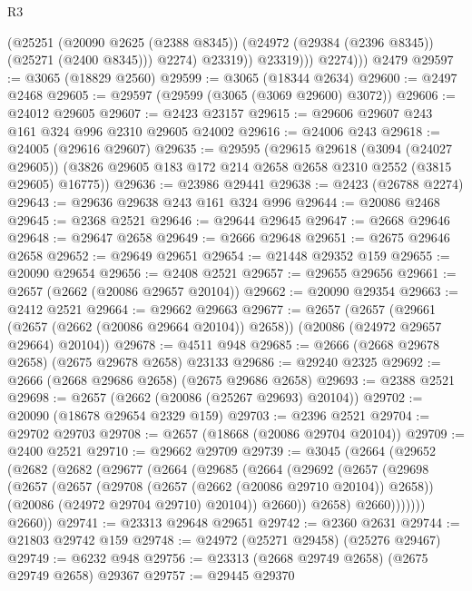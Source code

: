 \begin{lexlean}{R3}
\begin{coremodule}
                  (@25251
                    (@20090 @2625 (@2388 @8345))
                    (@24972 (@29384 (@2396 @8345)) (@25271 (@2400 @8345)))
                    @2274)
                  @23319))
              @23319)))
          @2274)))
    @2479
@29597 := @3065 (@18829 @2560)
@29599 := @3065 (@18344 @2634)
@29600 := @2497 @2468
@29605 := @29597 (@29599 (@3065 (@3069 @29600) @3072))
@29606 := @24012 @29605
@29607 := @2423 @23157
@29615 := @29606 @29607 @243 @161 @324 @996 @2310 @29605 @24002
@29616 := @24006 @243
@29618 := @24005 (@29616 @29607)
@29635 := @29595
    (@29615
      @29618
      (@3094 (@24027 @29605))
      (@3826 @29605 @183 @172 @214 @2658 @2658 @2310 @2552 (@3815 @29605) @16775))
@29636 := @23986 @29441
@29638 := @2423 (@26788 @2274)
@29643 := @29636 @29638 @243 @161 @324 @996
@29644 := @20086 @2468
@29645 := @2368 @2521
@29646 := @29644 @29645
@29647 := @2668 @29646
@29648 := @29647 @2658
@29649 := @2666 @29648
@29651 := @2675 @29646 @2658
@29652 := @29649 @29651
@29654 := @21448 @29352 @159
@29655 := @20090 @29654
@29656 := @2408 @2521
@29657 := @29655 @29656
@29661 := @2657 (@2662 (@20086 @29657 @20104))
@29662 := @20090 @29354
@29663 := @2412 @2521
@29664 := @29662 @29663
@29677 := @2657
    (@2657
      (@29661 (@2657 (@2662 (@20086 @29664 @20104)) @2658))
      (@20086 (@24972 @29657 @29664) @20104))
@29678 := @4511 @948
@29685 := @2666 (@2668 @29678 @2658) (@2675 @29678 @2658) @23133
@29686 := @29240 @2325
@29692 := @2666 (@2668 @29686 @2658) (@2675 @29686 @2658)
@29693 := @2388 @2521
@29698 := @2657 (@2662 (@20086 (@25267 @29693) @20104))
@29702 := @20090 (@18678 @29654 @2329 @159)
@29703 := @2396 @2521
@29704 := @29702 @29703
@29708 := @2657 (@18668 (@20086 @29704 @20104))
@29709 := @2400 @2521
@29710 := @29662 @29709
@29739 := @3045
    (@2664
      (@29652
        (@2682
          (@2682
            (@29677
              (@2664
                (@29685
                  (@2664
                    (@29692
                      (@2657
                        (@29698
                          (@2657
                            (@2657
                              (@29708 (@2657 (@2662 (@20086 @29710 @20104)) @2658))
                              (@20086 (@24972 @29704 @29710) @20104))
                            @2660))
                        @2658)
                      @2660)))))))
        @2660))
@29741 := @23313 @29648 @29651
@29742 := @2360 @2631
@29744 := @21803 @29742 @159
@29748 := @24972 (@25271 @29458) (@25276 @29467)
@29749 := @6232 @948
@29756 := @23313 (@2668 @29749 @2658) (@2675 @29749 @2658) @29367
@29757 := @29445 @29370

\end{coremodule}
\end{lexlean}
